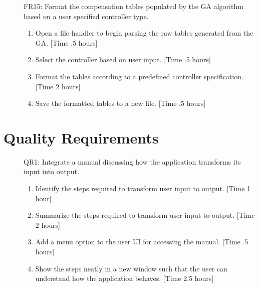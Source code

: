 \documentclass[pdftex,10pt,a4paper]{article}
\begin{document}
\begin{description}
\item[] FR15: Format the compensation tables populated by the GA algorithm based on a user specified controller type.
\begin{enumerate}
\item Open a file handler to begin parsing the raw tables generated from the GA. [Time .5 hours]
\item Select the controller based on user input. [Time .5 hours]
\item Format the tables according to a predefined controller specification. [Time 2 hours]
\item Save the formatted tables to a new file. [Time .5 hours]
\end{enumerate}
\end{description}

\section*{Quality Requirements}
\begin{description}
\item[] QR1: Integrate a manual discussing how the application transforms its input into output.
\begin{enumerate}
\item Identify the steps required to transform user input to output. [Time 1 hour]
\item Summarize the steps required to transform user input to output. [Time 2 hours]
\item Add a menu option to the user UI for accessing the manual. [Time .5 hours]
\item Show the steps neatly in a new window such that the user can understand how the application behaves. [Time 2.5 hours]
\end{enumerate}
\end{description}
\end{document}

